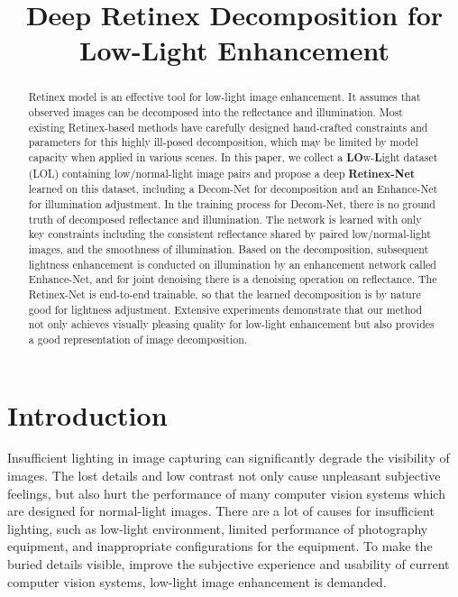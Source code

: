 \documentclass{bmvc2k}
\title{Deep Retinex Decomposition for Low-Light Enhancement}
\begin{document}
\maketitle

\begin{abstract}
Retinex model is an effective tool for low-light image enhancement. It assumes that observed images can be decomposed into the reflectance and illumination. Most existing Retinex-based methods have carefully designed hand-crafted constraints and parameters for this highly ill-posed decomposition, which may be limited by model capacity when applied in various scenes. In this paper, we collect a \textbf{LO}w-\textbf{L}ight dataset (LOL) containing low/normal-light image pairs and propose a deep \textbf{Retinex-Net} learned on this dataset, including a Decom-Net for decomposition and an Enhance-Net for illumination adjustment. In the training process for Decom-Net, there is no ground truth of decomposed reflectance and illumination. The network is learned with only key constraints including the consistent reflectance shared by paired low/normal-light images, and the smoothness of illumination. Based on the decomposition, subsequent lightness enhancement is conducted on illumination by an enhancement network called Enhance-Net, and for joint denoising there is a denoising operation on reflectance. The Retinex-Net is end-to-end trainable, so that the learned decomposition is by nature good for lightness adjustment. Extensive experiments demonstrate that our method not only achieves visually pleasing quality for low-light enhancement but also provides a good representation of image decomposition.
\end{abstract}

\section{Introduction}
\label{sec:intro}
Insufficient lighting in image capturing can significantly degrade the visibility of images. The lost details and low contrast not only cause unpleasant subjective feelings, but also hurt the performance of many computer vision systems which are designed for normal-light images. There are a lot of causes for insufficient lighting, such as low-light environment, limited performance of photography equipment, and inappropriate configurations for the equipment. To make the buried details visible, improve the subjective experience and usability of current computer vision systems, low-light image enhancement is demanded.
\end{document}
